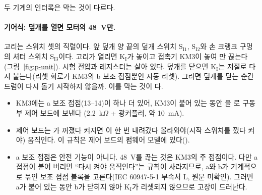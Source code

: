\Ours 두 기계의 인터록은 막는 것이 다르다.

\paragraph{기어식: 덮개를 열면 모터의 48~V만.} 고리는 스위치 셋의 직렬이다. 앞 덮개 양 끝의 덮개 스위치 S$_\mathrm{I1}$, S$_\mathrm{I2}$와
손 크랭크 구멍의 셔터 스위치 S$_\mathrm{I3}$이다. 고리가 열리면 K$_\mathrm{I}$가 놓이고 접촉기 KM3이 놓여 만 끊는다
(그림~\ref{fig:p-unit}). 시험 전압과 레지스터는 살아 있다. 덮개를 닫으면 K$_\mathrm{I}$는 저절로 다시 붙는다(리셋 회로가 KM3의 b
보조 접점뿐인 자동 리셋). 그러면 덮개를 닫는 순간 드럼이 다시 돌기 시작하지 않을까. 이를 막는 것이 다.
\begin{itemize}
\item KM3에는 a 보조 접점(13--14)이 하나 더 있어, KM3이 붙어 있는 동안 을 로 구동부 제어 보드에 보낸다
(2.2~k$\Omega$ + 광커플러, 약 10~mA).
\item 제어 보드는 가 꺼졌다 켜지면 이 한 번 내려갔다 올라와야(시작 스위치를 껐다 켜야) 움직인다. 이 규칙은 제어
보드의 펌웨어 모델에 있다().
\item a 보조 접점은 안전 기능이 아니다. 48~V를 끊는 것은 KM3의 주 접점이다. 다만 a 접점이 붙어 버리면 ``다시 켜야 움직인다''는 규칙이
사라지므로, a와 b가 기계적으로 묶인 보조 접점 블록을 고른다(IEC 60947-5-1 부속서 L, 원문 미확인). 그러면 a가 붙어 있는 동안 b가
닫히지 않아 K$_\mathrm{I}$가 리셋되지 않으므로 고장이 드러난다.
\end{itemize}

